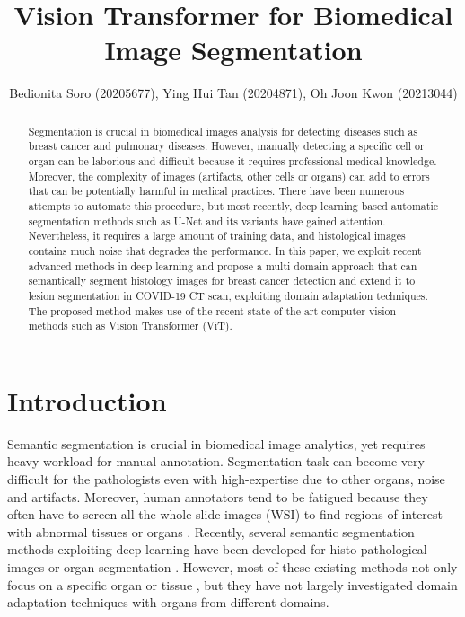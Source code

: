 \documentclass[final]{cvpr}
\begin{document}
\title{Vision Transformer for Biomedical Image Segmentation}
\author{Bedionita Soro (20205677), Ying Hui Tan (20204871), Oh Joon Kwon (20213044)}

\maketitle

\begin{abstract}
Segmentation is crucial in biomedical images analysis for detecting diseases such as breast cancer and pulmonary diseases. However, manually detecting a specific cell or organ can be laborious and difficult because it requires professional medical knowledge. Moreover, the complexity of images (artifacts, other cells or organs) can add to errors that can be potentially harmful in medical practices. There have been numerous attempts to automate this procedure, but most recently, deep learning based automatic segmentation methods such as U-Net and its variants have gained attention. 
Nevertheless, it requires a large amount of training data, and histological images contains much noise that degrades the performance. In this paper, we exploit  recent advanced methods in deep learning and propose a multi domain approach that can semantically segment histology images for breast cancer detection and extend it to lesion segmentation in COVID-19 CT scan, exploiting domain adaptation techniques. The proposed method makes use of the recent state-of-the-art computer vision methods such as Vision Transformer (ViT). 
\end{abstract}


\section{Introduction}
Semantic segmentation is crucial in biomedical image analytics, yet requires heavy workload for manual annotation. Segmentation task can become very difficult for the pathologists even with high-expertise due to other organs, noise and artifacts\cite{KRUPINSKI20061543}. Moreover, human annotators tend to be fatigued because they often have to screen all the whole slide images (WSI) to find regions of interest with abnormal tissues or organs \cite{Randell01}. Recently, several semantic segmentation methods exploiting deep learning have been developed for histo-pathological images or organ segmentation \cite{lei2020medical}. However, most of these existing methods not only focus on a specific organ or tissue \cite{chan2019histosegnet}, but they have not largely investigated domain adaptation techniques with organs from different domains.
\end{document}
